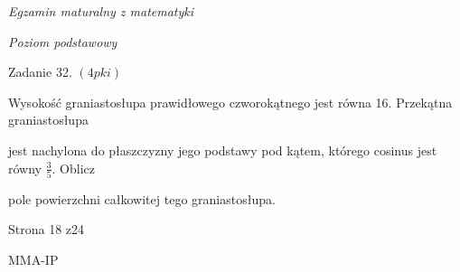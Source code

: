 \documentclass[a4paper,12pt]{article}
\begin{document}
{\it Egzamin maturalny z matematyki}

{\it Poziom podstawowy}

Zadanie 32. $(4pki)$

Wysokość graniastosłupa prawidłowego czworokątnego jest równa 16. Przekątna graniastosłupa

jest nachylona do płaszczyzny jego podstawy pod kątem, którego cosinus jest równy $\displaystyle \frac{3}{5}$. Oblicz

pole powierzchni całkowitej tego graniastosłupa.

Strona 18 z24

MMA-IP
\end{document}
